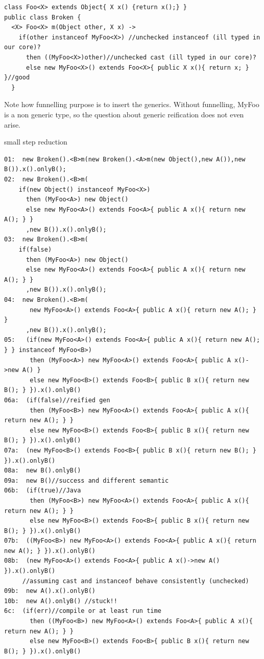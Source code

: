 \begin{lstlisting}
class Foo<X> extends Object{ X x() {return x();} }
public class Broken {
  <X> Foo<X> m(Object other, X x) ->
    if(other instanceof MyFoo<X>) //unchecked instanceof (ill typed in our core)?
      then ((MyFoo<X>)other)//unchecked cast (ill typed in our core)?
      else new MyFoo<X>() extends Foo<X>{ public X x(){ return x; } }//good
  }
\end{lstlisting}

Note how funnelling purpose is to insert the generics. Without funnelling, MyFoo is a non generic type, so the question about generic reification does not even arise.

small step reduction
\begin{verbatim}
01:  new Broken().<B>m(new Broken().<A>m(new Object(),new A()),new B()).x().onlyB();
02:  new Broken().<B>m(
    if(new Object() instanceof MyFoo<X>)
      then (MyFoo<A>) new Object()
      else new MyFoo<A>() extends Foo<A>{ public A x(){ return new A(); } }
      ,new B()).x().onlyB();
03:  new Broken().<B>m(
    if(false)
      then (MyFoo<A>) new Object()
      else new MyFoo<A>() extends Foo<A>{ public A x(){ return new A(); } }
      ,new B()).x().onlyB();
04:  new Broken().<B>m(
       new MyFoo<A>() extends Foo<A>{ public A x(){ return new A(); } }
      ,new B()).x().onlyB();
05:   (if(new MyFoo<A>() extends Foo<A>{ public A x(){ return new A(); } } instanceof MyFoo<B>)
       then (MyFoo<A>) new MyFoo<A>() extends Foo<A>{ public A x()->new A() }
       else new MyFoo<B>() extends Foo<B>{ public B x(){ return new B(); } }).x().onlyB()
06a:  (if(false)//reified gen
       then (MyFoo<B>) new MyFoo<A>() extends Foo<A>{ public A x(){ return new A(); } }
       else new MyFoo<B>() extends Foo<B>{ public B x(){ return new B(); } }).x().onlyB()
07a:  (new MyFoo<B>() extends Foo<B>{ public B x(){ return new B(); } }).x().onlyB()
08a:  new B().onlyB()
09a:  new B()//success and different semantic
06b:  (if(true)//Java
       then (MyFoo<B>) new MyFoo<A>() extends Foo<A>{ public A x(){ return new A(); } }
       else new MyFoo<B>() extends Foo<B>{ public B x(){ return new B(); } }).x().onlyB()
07b:  ((MyFoo<B>) new MyFoo<A>() extends Foo<A>{ public A x(){ return new A(); } }).x().onlyB()
08b:  (new MyFoo<A>() extends Foo<A>{ public A x()->new A() }).x().onlyB()
     //assuming cast and instanceof behave consistently (unchecked)
09b:  new A().x().onlyB()
10b:  new A().onlyB() //stuck!!
6c:  (if(err)//compile or at least run time
       then ((MyFoo<B>) new MyFoo<A>() extends Foo<A>{ public A x(){ return new A(); } }
       else new MyFoo<B>() extends Foo<B>{ public B x(){ return new B(); } }).x().onlyB()
\end{verbatim}

